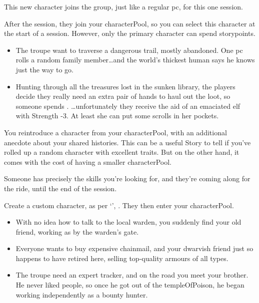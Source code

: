 \begin{multicols}{2}
This new character joins the group, just like a regular \gls{pc}, for this one session.

After the session, they join your \gls{characterPool}, so you can select this character at the start of a session.
However, only the primary character can spend \glspl{storypoint}.

\begin{itemize}
  \item
  The troupe want to traverse a dangerous trail, mostly abandoned.
  One \gls{pc} rolls a random family member\ldots and the world's thickest human says he knows just the way to go.
  \item
  Hunting through all the treasures lost in the sunken library, the players decide they really need an extra pair of hands to haul out the loot, so someone spends .
  \ldots unfortunately they receive the aid of an emaciated elf with Strength -3.
  At least she can put some scrolls in her pockets.
\end{itemize}

\label{returnFriend}
You reintroduce a character from your \gls{characterPool}, with an additional anecdote about your shared histories.
This can be a useful Story to tell if you've rolled up a random character with excellent \glspl{trait}.
But on the other hand, it comes with the cost of having a smaller \gls{characterPool}.

\label{designCharacter}
Someone has precisely the skills you're looking for, and they're coming along for the ride, until the end of the session.

Create a custom character, as per `', .
They then enter your \gls{characterPool}.

\begin{itemize}
  \item
  With no idea how to talk to the local \gls{warden}, you suddenly find your old friend, working as  by the \gls{warden}'s gate.
  \item
  Everyone wants to buy expensive chainmail, and your dwarvish friend just so happens to have retired here, selling top-quality armours of all types.
  \item
  The troupe need an expert tracker, and on the road you meet your brother.
  He never liked people, so once he got out of the \gls{templeOfPoison}, he began working independently as a bounty hunter.
\end{itemize}


\end{multicols}
